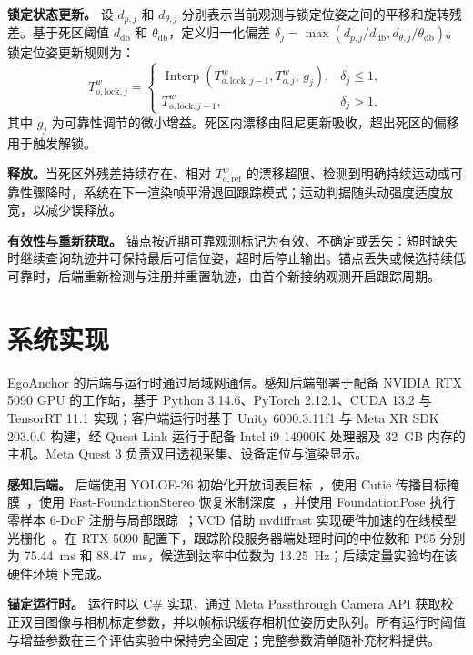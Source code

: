 \documentclass[review]{vgtc}
\begin{document}
\textbf{锁定状态更新。}
设 $d_{p,j}$ 和 $d_{\theta,j}$ 分别表示当前观测与锁定位姿之间的平移和旋转残差。基于死区阈值 $d_{\mathrm{db}}$ 和 $\theta_{\mathrm{db}}$，定义归一化偏差 $\delta_j=\max(d_{p,j}/d_{\mathrm{db}},d_{\theta,j}/\theta_{\mathrm{db}})$。锁定位姿更新规则为：
\begin{equation}
T_{o,\mathrm{lock},j}^w =
\begin{cases}
\operatorname{Interp}\left(T_{o,\mathrm{lock},j-1}^w, T_{o,j}^{w};\, g_j\right), & \delta_j \leq 1, \\
T_{o,\mathrm{lock},j-1}^w, & \delta_j > 1.
\end{cases}
\label{eq:lock-update}
\end{equation}
其中 $g_j$ 为可靠性调节的微小增益。死区内漂移由阻尼更新吸收，超出死区的偏移用于触发解锁。

\textbf{释放。}当死区外残差持续存在、相对 $T_{o,\mathrm{ref}}^w$ 的漂移超限、检测到明确持续运动或可靠性骤降时，系统在下一渲染帧平滑退回跟踪模式；运动判据随头动强度适度放宽，以减少误释放。

\textbf{有效性与重新获取。}\label{sec:validity}
锚点按近期可靠观测标记为有效、不确定或丢失：短时缺失时继续查询轨迹并可保持最后可信位姿，超时后停止输出。锚点丢失或候选持续低可靠时，后端重新检测与注册并重置轨迹，由首个新接纳观测开启跟踪周期。

\section{系统实现}\label{sec:implementation}

EgoAnchor 的后端与运行时通过局域网通信。感知后端部署于配备 NVIDIA RTX 5090 GPU 的工作站，基于 Python 3.14.6、PyTorch 2.12.1、CUDA 13.2 与 TensorRT 11.1 实现；客户端运行时基于 Unity 6000.3.11f1 与 Meta XR SDK 203.0.0 构建，经 Quest Link 运行于配备 Intel i9-14900K 处理器及 32~GB 内存的主机。Meta Quest 3 负责双目透视采集、设备定位与渲染显示。

\textbf{感知后端。}
后端使用 YOLOE-26 初始化开放词表目标~\cite{yoloe2025}，使用 Cutie 传播目标掩膜~\cite{cutie2024}，使用 Fast-FoundationStereo 恢复米制深度~\cite{fastfoundationstereo2026}，并使用 FoundationPose 执行零样本 6-DoF 注册与局部跟踪~\cite{foundationpose2024}；VCD 借助 nvdiffrast 实现硬件加速的在线模型光栅化~\cite{nvdiffrast2020}。在 RTX 5090 配置下，跟踪阶段服务器端处理时间的中位数和 P95 分别为 75.44~ms 和 88.47~ms，候选到达率中位数为 13.25~Hz；后续定量实验均在该硬件环境下完成。

\textbf{锚定运行时。}
运行时以 C\# 实现，通过 Meta Passthrough Camera API 获取校正双目图像与相机标定参数，并以帧标识缓存相机位姿历史队列。所有运行时阈值与增益参数在三个评估实验中保持完全固定；完整参数清单随补充材料提供。
\end{document}
